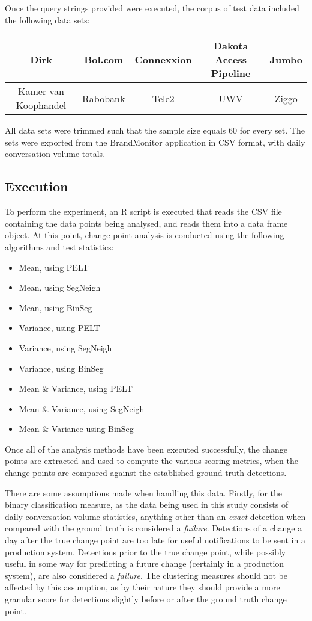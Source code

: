 \documentclass[../main.tex]{subfiles}
\begin{document}
Once the query strings provided were executed, the corpus of test data included the following data sets:

\begin{table}[h]
\centering
\begin{tabular}{|c|c|c|c|c|}
\hline
Dirk & Bol.com & Connexxion & Dakota Access Pipeline & Jumbo \\ \hline
Kamer van Koophandel & Rabobank & Tele2 & UWV & Ziggo\\ \hline
\end{tabular}
\end{table}

All data sets were trimmed such that the sample size equals 60 for every set. The sets were exported from the BrandMonitor application in CSV format, with daily conversation volume totals.

\subsection{Execution}

To perform the experiment, an \textsf{R} script is executed that reads the CSV file containing the data points being analysed, and reads them into a data frame object. At this point, change point analysis is conducted using the following algorithms and test statistics:

\begin{itemize}
    \item Mean, using PELT
    \item Mean, using SegNeigh
    \item Mean, using BinSeg
    \item Variance, using PELT
    \item Variance, using SegNeigh
    \item Variance, using BinSeg
    \item Mean \& Variance, using PELT
    \item Mean \& Variance, using SegNeigh
    \item Mean \& Variance using BinSeg
\end{itemize}

Once all of the analysis methods have been executed successfully, the change points are extracted and used to compute the various scoring metrics, when the change points are compared against the established ground truth detections.

There are some assumptions made when handling this data. Firstly, for the binary classification measure, as the data being used in this study consists of daily conversation volume statistics, anything other than an \emph{exact} detection when compared with the ground truth is considered a \emph{failure}. Detections of a change a day after the true change point are too late for useful notifications to be sent in a production system. Detections prior to the true change point, while possibly useful in some way for predicting a future change (certainly in a production system), are also considered a \emph{failure}. The clustering measures should not be affected by this assumption, as by their nature they should provide a more granular score for detections slightly before or after the ground truth change point.
\end{document}
